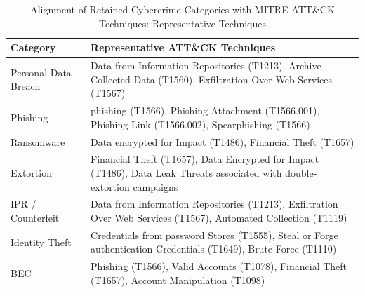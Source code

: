 \begin{table}[htbp]
\centering
\caption{Alignment of Retained Cybercrime Categories with MITRE ATT\&CK Techniques: Representative Techniques}
\label{tab:attack_alignment_2}
\begin{tabular}{|p{3.5cm}|p{8.0cm}|}
\hline
\textbf{Category} & \textbf{Representative ATT\&CK Techniques} \\
\hline
Personal Data Breach & Data from Information Repositories (T1213), Archive Collected Data (T1560), Exfiltration Over Web Services (T1567) \\
\hline
Phishing & \gls{phishing} (T1566), Phishing Attachment (T1566.001), Phishing Link (T1566.002), Spearphishing (T1566) \\
\hline
Ransomware & Data \gls{encrypt}ed for Impact (T1486), Financial Theft (T1657) \\
\hline
Extortion & Financial Theft (T1657), Data Encrypted for Impact (T1486), Data Leak Threats associated with double-extortion campaigns \\
\hline
IPR / Counterfeit & Data from Information Repositories (T1213), Exfiltration Over Web Services (T1567), Automated Collection (T1119) \\
\hline
Identity Theft & Credentials from \gls{password} Stores (T1555), Steal or Forge \gls{authentication} Credentials (T1649), Brute Force (T1110) \\
\hline
BEC & Phishing (T1566), Valid Accounts (T1078), Financial Theft (T1657), Account Manipulation (T1098) \\
\hline
\end{tabular}
\end{table}



\markchapterendnotes